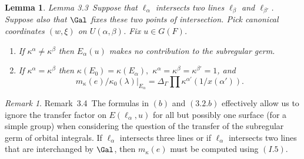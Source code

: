 \documentclass{memo-l}
\newtheorem{lemma}[theorem]{Lemma}
\theoremstyle{definition}
\theoremstyle{remark}
\newtheorem{remark}[theorem]{Remark}
\numberwithin{section}{chapter}
\numberwithin{equation}{chapter}
\begin{document}
{\medskip}

\begin{lemma}{Lemma 3.3}\ Suppose that ${\ell}_{{\alpha}}$
intersects two lines ${\ell}_{{\beta}}$ and ${\ell}_{{\beta}'}$. Suppose also that
$\Gal$ fixes these two points of intersection.  Pick canonical
coordinates $(w,{\xi})$ on $U({\alpha},{\beta})$.  Fix $u  \in  G(F)$.
\begin{enumerate}[label=\alph*)]
\item If ${\kappa}^{{\alpha}} \ne {\kappa}^{{\beta}}$ then $E_{{\alpha}}(u)$
makes no contribution to the subregular germ.
\item If ${\kappa}^{{\alpha}} = {\kappa}^{{\beta}}$ then ${\kappa}(E_{0})  =
{\kappa}(E_{{\alpha}}),$
${\kappa}^{{\alpha}} ={\kappa}^{{\beta}} = {\kappa}^{{\beta}'} = 1$, and
$$m_{{\kappa}}(e)/{\kappa}_{0}({\lambda})\vert _{E_\alpha}  =
{\Delta}_{{\Gamma}}\prod{\kappa}^{{\alpha}'}(1/x({\alpha}')).$$
\end{enumerate}
\end{lemma}

\begin{remark}{Remark\ 3.4}\ The formulas in $(b)$ and $(3.2.b)$ effectively
allow us to ignore the transfer factor on $E({\ell}_{{\alpha}},u)$ for all
but possibly one surface (for a simple group) when considering the question
of the transfer of the subregular germ of orbital integrals.  If
${\ell}_{{\alpha}}$ intersects three lines or if ${\ell}_{{\alpha}}$
intersects two lines that are interchanged by $\Gal$, then
$m_{{\kappa}}(e)$ must be computed using $(I.5)$.
\end{remark}
\end{document}
